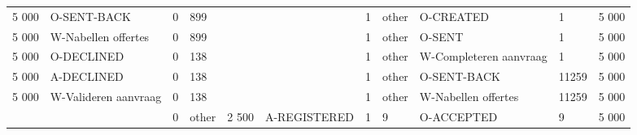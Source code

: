 \begin{tabular}{llllllllllr}
5 000 & O-SENT-BACK & 0 & 899 &  &  & 1 & other & O-CREATED & 1 & 5 000 \\
5 000 & W-Nabellen offertes & 0 & 899 &  &  & 1 & other & O-SENT & 1 & 5 000 \\
5 000 & O-DECLINED & 0 & 138 &  &  & 1 & other & W-Completeren aanvraag & 1 & 5 000 \\
5 000 & A-DECLINED & 0 & 138 &  &  & 1 & other & O-SENT-BACK & 11259 & 5 000 \\
5 000 & W-Valideren aanvraag & 0 & 138 &  &  & 1 & other & W-Nabellen offertes & 11259 & 5 000 \\
 &  & 0 & other & 2 500 & A-REGISTERED & 1 & 9 & O-ACCEPTED & 9 & 5 000 \\
\bottomrule
\end{tabular}
